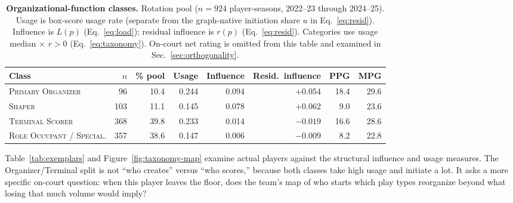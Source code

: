 \documentclass[11pt]{article}
\newcommand{\load}{\ensuremath{L}} %
\newcommand{\resid}{\ensuremath{r}} %
\begin{document}
\begin{table}[H]
\centering\small
\caption{\textbf{Organizational-function classes.} Rotation pool ($n=924$ player-seasons,
2022--23 through 2024--25). Usage is box-score usage rate (separate from the graph-native
initiation share $u$ in Eq.~\ref{eq:resid}). Influence is $\load(p)$ (Eq.~\ref{eq:load});
residual influence is $\resid(p)$ (Eq.~\ref{eq:resid}). Categories use usage median
$\times$ $\resid>0$ (Eq.~\ref{eq:taxonomy}). On-court net rating is omitted from this table
and examined in Sec.~\ref{sec:orthogonality}.}
\label{tab:taxonomy}
\begin{tabular}{lrrrrrrr}
\toprule
Class & $n$ & \% pool & Usage & Influence & Resid.\ influence & PPG & MPG \\
\midrule
\textsc{Primary Organizer} & 96 & 10.4 & 0.244 & 0.094 & $+0.054$ & 18.4 & 29.6 \\
\textsc{Shaper} & 103 & 11.1 & 0.145 & 0.078 & $+0.062$ & 9.0 & 23.6 \\
\textsc{Terminal Scorer} & 368 & 39.8 & 0.233 & 0.014 & $-0.019$ & 16.6 & 28.6 \\
\textsc{Role Occupant / Special.} & 357 & 38.6 & 0.147 & 0.006 & $-0.009$ & 8.2 & 22.8 \\
\bottomrule
\end{tabular}
\end{table}

Table~\ref{tab:exemplars} and Figure~\ref{fig:taxonomy-map} examine actual players against
the structural influence and usage measures. The Organizer/Terminal split is not ``who
creates'' versus ``who scores,'' because both classes take high usage and initiate a lot. It
asks a more specific on-court question: when this player leaves the floor, does the team's
map of who starts which play types reorganize beyond what losing that much volume would
imply?
\end{document}
